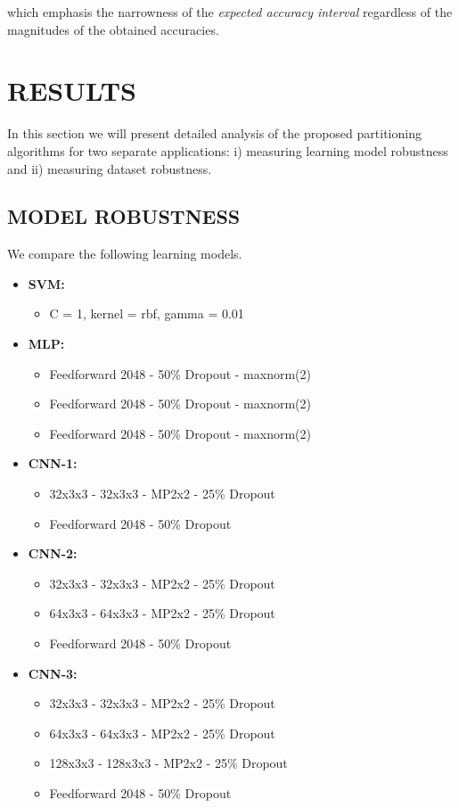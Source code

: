 \documentclass[letterpaper]{article}
\begin{document}
which emphasis the narrowness of the \textit{expected accuracy interval} regardless of the magnitudes of the obtained accuracies.

\section{RESULTS}

In this section we will present detailed analysis of the proposed partitioning algorithms for two separate applications: i) measuring learning model robustness and ii) measuring dataset robustness.

\subsection{MODEL ROBUSTNESS}

We compare the following learning models.

\begin{small}
\begin{itemize}
	\item \textbf{SVM:}
	\begin{itemize}
		\item C = 1, kernel = rbf, gamma = 0.01
	\end{itemize}		
\item \textbf{MLP:} 
	\begin{itemize}
	\item Feedforward 2048 - 50\% Dropout - maxnorm(2)
	\item Feedforward 2048 - 50\% Dropout - maxnorm(2)
	\item Feedforward 2048 - 50\% Dropout - maxnorm(2)
	\end{itemize}
\item \textbf{CNN-1:}
	\begin{itemize}
	 \item 32x3x3 - 32x3x3 - MP2x2 - 25\% Dropout 
	 \item Feedforward 2048 - 50\% Dropout
	\end{itemize}
\item \textbf{CNN-2:}
	\begin{itemize}
	\item 32x3x3 - 32x3x3 - MP2x2 - 25\% Dropout 
	\item 64x3x3 - 64x3x3 - MP2x2 - 25\% Dropout 
	\item Feedforward 2048 - 50\% Dropout
	\end{itemize}
\item \textbf{CNN-3:}
\begin{itemize}
	\item 32x3x3 - 32x3x3 - MP2x2 - 25\% Dropout 
	\item 64x3x3 - 64x3x3 - MP2x2 - 25\% Dropout 
	\item 128x3x3 - 128x3x3 - MP2x2 - 25\% Dropout 
	\item Feedforward 2048 - 50\% Dropout
\end{itemize}	
\end{itemize}
\end{small}
\end{document}

